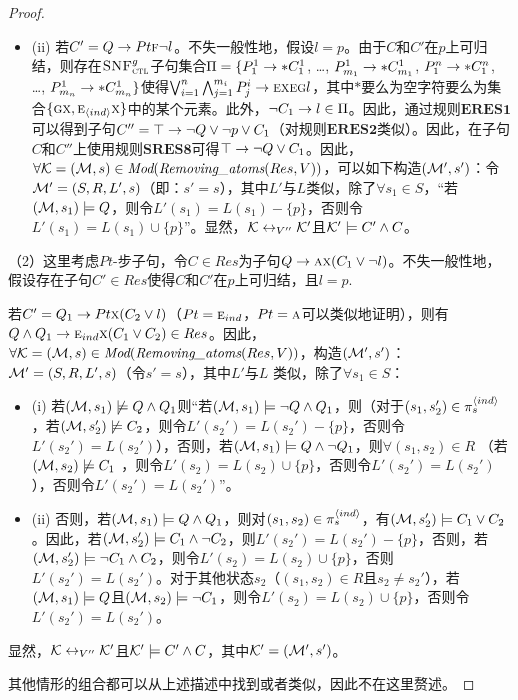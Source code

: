 \begin{proof}
\begin{itemize}
\begin{itemize}
		\item[] (ii) 若$C' =  Q\rightarrow Pt \textsc{f} \neg l$。不失一般性地，假设$l=p$。由于$C$和$C'$在$p$上可归结，则存在${\textsc{SNF}_{\textsc{ctl}}^g}$子句集合$\Pi=\{P_1^1 \rightarrow * C_1^1$, \dots, $P_{m_1}^1 \rightarrow * C_{m_1}^1$, $P_1^n \rightarrow * C_1^n$, \dots, $P_{m_n}^1 \rightarrow * C_{m_n}^1 \}$使得$\bigvee_{i=1}^n \bigwedge_{j=1}^{m_i} P_j^i \rightarrow \textsc{e} \textsc{x} \textsc{e} \textsc{g} l$，其中$*$要么为空字符要么为集合$\{\textsc{g} \textsc{x}, \textsc{e}_{{\langle{ind}\rangle}} \textsc{x}\}$中的某个元素。此外，$\neg C_1 \rightarrow l\in \Pi$。因此，通过规则$\textbf{ERES1}$可以得到子句$C''=\top \rightarrow \neg Q \vee \neg p \vee C_1$（对规则$\textbf{ERES2}$类似）。因此，在子句$C$和$C''$上使用规则$\textbf{SRES8}$可得$\top \rightarrow \neg Q \vee C_1$。因此，$\forall {\cal K}=({\cal M}, s)\in \textit{Mod}(\emph{Removing\_atoms}(Res, V))$，可以如下构造$({\cal M}',s')$：令${\cal M}'= (S, R, L',s)$（即：$s'=s$），其中$L'$与$L$类似，除了$\forall s_1\in S$，“若$({\cal M}, s_1) \models Q$，则令$L'(s_1) = L(s_1) - \{p\}$，否则令$L'(s_1) = L(s_1) \cup \{p\}$”。显然，${\cal K} \leftrightarrow_{V''} {\cal K}'$且${\cal K}' \models C' \wedge C$。  
	\end{itemize}
\end{itemize}

（2）这里考虑$Pt$-步子句，令$C\in Res$为子句$Q \rightarrow \textsc{a} \textsc{x}(C_1 \vee \neg l)$。不失一般性地，假设存在子句$C'\in Res$使得$C$和$C'$在$p$上可归结，且$l=p$.

若$C'= Q_1\rightarrow Pt \textsc{x} (C_2 \vee l)$（$Pt=\textsc{e}_{ind}$，$Pt = \textsc{a}$可以类似地证明），则有$Q \wedge Q_1 \rightarrow \textsc{e}_{ind} \textsc{x}(C_1 \vee C_2) \in Res$。因此，$\forall {\cal K}=({\cal M}, s)\in \textit{Mod}(\emph{Removing\_atoms}(Res, V))$，构造$({\cal M}',s')$：${\cal M}'= (S, R, L',s)$（令$s'=s$），其中$L'$与$L$ 类似，除了$\forall s_1\in S$：
\begin{itemize}
	\item[] (i) 若$({\cal M}, s_1) \not \models Q \wedge Q_1$则“若$({\cal M}, s_1) \models \neg Q \wedge Q_1$，则（对于$(s_1, s_2') \in \pi_s^{{\langle{ind}\rangle}}$，若$({\cal M}, s_2') \not \models C_2$，则令$L'(s_2') = L(s_2') - \{p\}$，否则令$L'(s_2') = L(s_2')$），否则，若$({\cal M}, s_1) \models Q \wedge \neg Q_1$，则$\forall (s_1, s_2) \in R$ （若$({\cal M}, s_2) \not \models C_1$ ，则令$L'(s_2) = L(s_2) \cup \{p\}$，否则令$L'(s_2') = L(s_2')$），否则令$L'(s_2') = L(s_2')$”。
	\item[] (ii) 否则，若$({\cal M}, s_1) \models Q \wedge Q_1$，则对$(s_1, s_2) \in \pi_s^{{\langle{ind}\rangle}}$，有$({\cal M},s_2') \models C_1 \vee C_2$。因此，若$({\cal M}, s_2') \models C_1 \wedge \neg C_2$，则$L'(s_2') = L(s_2') - \{p\}$，否则，若$({\cal M}, s_2') \models \neg C_1 \wedge C_2$，则令$L'(s_2) = L(s_2) \cup \{p\}$，否则$L'(s_2') = L(s_2')$。对于其他状态$s_2$（$(s_1, s_2) \in R$且$s_2 \not = s_2'$），若$({\cal M}, s_1) \models Q$且$({\cal M}, s_2) \models \neg C_1$，则令$L'(s_2) = L(s_2) \cup \{p\}$，否则令$L'(s_2') = L(s_2')$。
\end{itemize}
显然，${\cal K} \leftrightarrow_{V''} {\cal K}'$且${\cal K}' \models C' \wedge C$，其中${\cal K}' = ({\cal M}',s')$。 

其他情形的组合都可以从上述描述中找到或者类似，因此不在这里赘述。
\end{proof}


